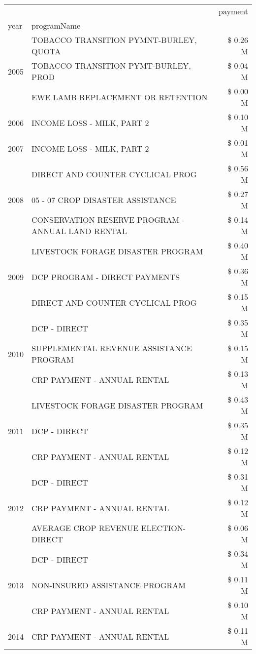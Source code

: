 \begin{tabular}{llr}
\toprule
 &  & payment \\
year & programName &  \\
\midrule
\multirow[t]{3}{*}{2005} & TOBACCO TRANSITION PYMNT-BURLEY, QUOTA & \$ 0.26 M \\
 & TOBACCO TRANSITION PYMT-BURLEY, PROD & \$ 0.04 M \\
 & EWE LAMB REPLACEMENT OR RETENTION & \$ 0.00 M \\
\cline{1-3}
2006 & INCOME LOSS - MILK, PART 2 & \$ 0.10 M \\
\cline{1-3}
2007 & INCOME LOSS - MILK, PART 2 & \$ 0.01 M \\
\cline{1-3}
\multirow[t]{3}{*}{2008} & DIRECT AND COUNTER CYCLICAL PROG & \$ 0.56 M \\
 & 05 - 07 CROP DISASTER ASSISTANCE & \$ 0.27 M \\
 & CONSERVATION RESERVE PROGRAM - ANNUAL LAND RENTAL & \$ 0.14 M \\
\cline{1-3}
\multirow[t]{3}{*}{2009} & LIVESTOCK FORAGE DISASTER  PROGRAM & \$ 0.40 M \\
 & DCP PROGRAM - DIRECT PAYMENTS & \$ 0.36 M \\
 & DIRECT AND COUNTER CYCLICAL PROG & \$ 0.15 M \\
\cline{1-3}
\multirow[t]{3}{*}{2010} & DCP - DIRECT & \$ 0.35 M \\
 & SUPPLEMENTAL REVENUE ASSISTANCE PROGRAM & \$ 0.15 M \\
 & CRP PAYMENT - ANNUAL RENTAL & \$ 0.13 M \\
\cline{1-3}
\multirow[t]{3}{*}{2011} & LIVESTOCK FORAGE DISASTER PROGRAM & \$ 0.43 M \\
 & DCP - DIRECT & \$ 0.35 M \\
 & CRP PAYMENT - ANNUAL RENTAL & \$ 0.12 M \\
\cline{1-3}
\multirow[t]{3}{*}{2012} & DCP - DIRECT & \$ 0.31 M \\
 & CRP PAYMENT - ANNUAL RENTAL & \$ 0.12 M \\
 & AVERAGE CROP REVENUE ELECTION-DIRECT & \$ 0.06 M \\
\cline{1-3}
\multirow[t]{3}{*}{2013} & DCP - DIRECT & \$ 0.34 M \\
 & NON-INSURED ASSISTANCE PROGRAM & \$ 0.11 M \\
 & CRP PAYMENT - ANNUAL RENTAL & \$ 0.10 M \\
\cline{1-3}
\multirow[t]{3}{*}{2014} & CRP PAYMENT - ANNUAL RENTAL & \$ 0.11 M \\

\end{tabular}

